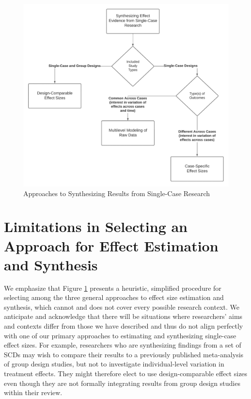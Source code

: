\documentclass[
]{book}
\begin{document}
\begin{figure}
\includegraphics[width=9.94in]{images/flowchart_SynthesizingResults} \caption{Approaches to Synthesizing Results from Single-Case Research}\label{fig:synthesis-flow-chart}
\end{figure}

\hypertarget{limitations-in-selecting-an-approach-for-effect-estimation-and-synthesis}{%
\section{Limitations in Selecting an Approach for Effect Estimation and Synthesis}\label{limitations-in-selecting-an-approach-for-effect-estimation-and-synthesis}}

We emphasize that Figure \ref{fig:synthesis-flow-chart} presents a heuristic, simplified procedure for selecting among the three general approaches to effect size estimation and synthesis, which cannot and does not cover every possible research context.
We anticipate and acknowledge that there will be situations where researchers' aims and contexts differ from those we have described and thus do not align perfectly with one of our primary approaches to estimating and synthesizing single-case effect sizes.
For example, researchers who are synthesizing findings from a set of SCDs may wish to compare their results to a previously published meta-analysis of group design studies, but not to investigate individual-level variation in treatment effects.
They might therefore elect to use design-comparable effect sizes even though they are not formally integrating results from group design studies within their review.
\end{document}
